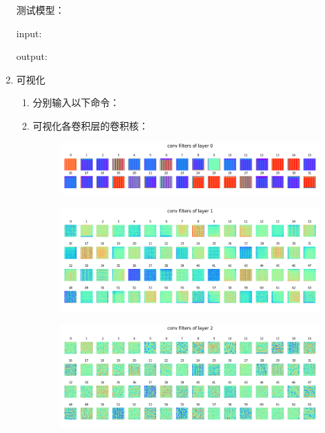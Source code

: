 \documentclass[a4paper]{article}
\begin{document}
\begin{enumerate}
        测试模型：

        input:
        

        output:
        
    \vspace{2em}


    \item 可视化
    \begin{enumerate}
        \item[]
        分别输入以下命令：
        
        \vspace{2em}

        \item 可视化各卷积层的卷积核：
        \begin{figure}[H]
            \centering
            \includegraphics[width=0.65\linewidth]{../result/4_conv_filters_layer0.png}
            \caption{}
        \end{figure}
        \begin{figure}[H]
            \centering
            \includegraphics[width=0.65\linewidth]{../result/4_filter_layer1.png}
            \caption{}
        \end{figure}
        \begin{figure}[H]
            \centering
            \includegraphics[width=0.65\linewidth]{../result/4_filter_layer2.png}
            \caption{}
        \end{figure}
        \begin{figure}[H]
            \centering

\end{figure}
\end{enumerate}
\end{enumerate}
\end{document}
